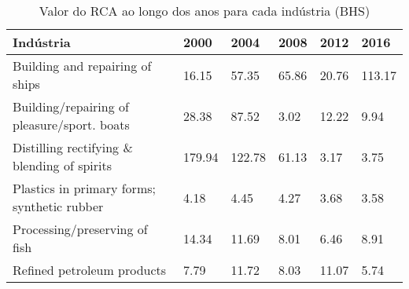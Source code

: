\begin{table}
\centering
\caption{Valor do RCA ao longo dos anos para cada indústria (BHS)}
\begin{tabular}{p{6cm}p{1.5cm}p{1.5cm}p{1.5cm}p{1.5cm}p{1.5cm}}
\toprule
                                  Indústria &   2000 &   2004 &  2008 &  2012 &   2016 \\
\midrule
            Building and repairing of ships &  16.15 &  57.35 & 65.86 & 20.76 & 113.17 \\
Building/repairing of pleasure/sport. boats &  28.38 &  87.52 &  3.02 & 12.22 &   9.94 \\
Distilling rectifying \& blending of spirits & 179.94 & 122.78 & 61.13 &  3.17 &   3.75 \\
Plastics in primary forms; synthetic rubber &   4.18 &   4.45 &  4.27 &  3.68 &   3.58 \\
              Processing/preserving of fish &  14.34 &  11.69 &  8.01 &  6.46 &   8.91 \\
                 Refined petroleum products &   7.79 &  11.72 &  8.03 & 11.07 &   5.74 \\
\bottomrule
\end{tabular}
\end{table}
